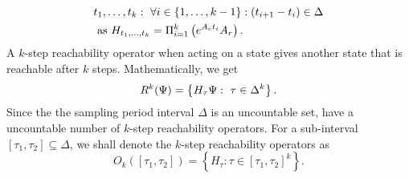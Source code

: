 %        
\begin{align*}
& t_1, \ldots ,t_k:~\forall
  i\in\{1,\ldots,k-1\}:(t_{i+1}-t_{i})\in\Delta\\
& \text{ as } H_{t_1,...,t_k}=\Pi_{i=1}^k\left(e^{A_ct_i}A_r\right).
\end{align*}
%
A $k$-step reachability operator when acting on a state gives another
state that is reachable after $k$ steps.  Mathematically, we get
%
\[
R^k(\Psi)=\left\{H_\tau\Psi:~\tau\in\Delta^k\right\}.
\]
%
Since the the sampling period interval $\Delta$ is an uncountable set,
have a uncountable number of $k$-step reachability operators.  For a
sub-interval $[\tau_1,\tau_2]\subseteq\Delta$, we shall denote the
$k$-step reachability operators as
%
\begin{equation}\label{eqn:operators}
O_k([\tau_1,\tau_2])=\left\{H_\tau:\tau\in[\tau_1,\tau_2]^k\right\}.
\end{equation}



